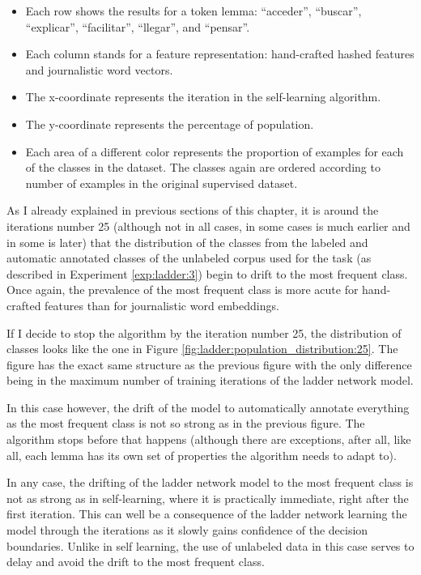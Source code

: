 \begin{itemize}
  \item Each row shows the results for a token lemma: ``acceder'', ``buscar'',
    ``explicar'', ``facilitar'', ``llegar'', and ``pensar''.
  \item Each column stands for a feature representation: hand-crafted hashed
    features and journalistic word vectors.
  \item The x-coordinate represents the iteration in the self-learning
    algorithm.
  \item The y-coordinate represents the percentage of population.
  \item Each area of a different color represents the proportion of examples
    for each of the classes in the dataset. The classes again are ordered
    according to number of examples in the original supervised dataset.
\end{itemize}

As I already explained in previous sections of this chapter, it is around the
iterations number 25 (although not in all cases, in some cases is much earlier
and in some is later) that the distribution of the classes from the labeled and
automatic annotated classes of the unlabeled corpus used for the task (as
described in Experiment \ref{exp:ladder:3}) begin to drift to the most frequent
class. Once again, the prevalence of the most frequent class is more acute for
hand-crafted features than for journalistic word embeddings.

If I decide to stop the algorithm by the iteration number 25, the distribution
of classes looks like the one in Figure
\ref{fig:ladder:population_distribution:25}. The figure has the exact same
structure as the previous figure with the only difference being in the maximum
number of training iterations of the ladder network model.

In this case however, the drift of the model to automatically annotate
everything as the most frequent class is not so strong as in the previous
figure. The algorithm stops before that happens (although there are exceptions,
after all, like all, each lemma has its own set of properties the algorithm
needs to adapt to).

In any case, the drifting of the ladder network model to the most frequent
class is not as strong as in self-learning, where it is practically immediate,
right after the first iteration. This can well be a consequence of the ladder
network learning the model through the iterations as it slowly gains confidence
of the decision boundaries. Unlike in self learning, the use of unlabeled data
in this case serves to delay and avoid the drift to the most frequent class.

